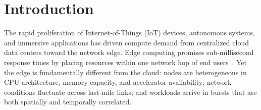 \chapter{Introduction}
\label{ch:intro}

The rapid proliferation of Internet-of-Things (IoT) devices, autonomous
systems, and immersive applications has driven compute demand from centralized
cloud data centers toward the network edge. Edge computing promises
sub-millisecond response times by placing resources within one network hop of
end users~\cite{satyanarayanan2017emergence}. Yet the edge is fundamentally
different from the cloud: nodes are heterogeneous in CPU architecture, memory
capacity, and accelerator availability; network conditions fluctuate across
last-mile links; and workloads arrive in bursts that are both spatially and
temporally correlated.
